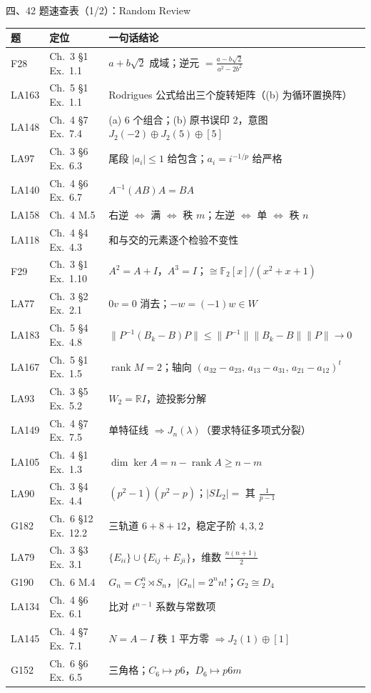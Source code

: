 \documentclass[aspectratio=169,10pt,fontset=none]{ctexbeamer}
\begin{document}
\begin{frame}[t]{四、42 题速查表（1/2）：Random Review}
  \label{sec:answers}
  \centering\scriptsize
  \setlength{\tabcolsep}{3.2pt}
  \renewcommand{\arraystretch}{0.95}
  \begin{tabular}{@{}l l l@{}}
    \toprule
    题 & 定位 & 一句话结论\\
    \midrule
    F28 & Ch.~3 \S1 Ex.~1.1 & $a+b\sqrt2$ 成域；逆元 $=\frac{a-b\sqrt2}{a^2-2b^2}$\\
    LA163 & Ch.~5 \S1 Ex.~1.1 & Rodrigues 公式给出三个旋转矩阵（(b) 为循环置换阵）\\
    LA148 & Ch.~4 \S7 Ex.~7.4 & (a) 6 个组合；(b) 原书误印 $2$，意图 $J_2(-2)\oplus J_2(5)\oplus[5]$\\
    LA97 & Ch.~3 \S6 Ex.~6.3 & 尾段 $|a_i|\le1$ 给包含；$a_i=i^{-1/p}$ 给严格\\
    LA140 & Ch.~4 \S6 Ex.~6.7 & $A^{-1}(AB)A=BA$\\
    LA158 & Ch.~4 M.5 & 右逆 $\Leftrightarrow$ 满 $\Leftrightarrow$ 秩 $m$；左逆 $\Leftrightarrow$ 单 $\Leftrightarrow$ 秩 $n$\\
    LA118 & Ch.~4 \S4 Ex.~4.3 & 和与交的元素逐个检验不变性\\
    F29 & Ch.~3 \S1 Ex.~1.10 & $A^2=A+I$，$A^3=I$；$\cong\mathbb F_2[x]/(x^2+x+1)$\\
    LA77 & Ch.~3 \S2 Ex.~2.1 & $0v=0$ 消去；$-w=(-1)w\in W$\\
    LA183 & Ch.~5 \S4 Ex.~4.8 & $\|P^{-1}(B_k-B)P\|\le\|P^{-1}\|\|B_k-B\|\|P\|\to0$\\
    LA167 & Ch.~5 \S1 Ex.~1.5 & $\operatorname{rank}M=2$；轴向 $(a_{32}{-}a_{23},\,a_{13}{-}a_{31},\,a_{21}{-}a_{12})^t$\\
    LA93 & Ch.~3 \S5 Ex.~5.2 & $W_2=\mathbb RI$，迹投影分解\\
    LA149 & Ch.~4 \S7 Ex.~7.5 & 单特征线 $\Rightarrow J_n(\lambda)$（要求特征多项式分裂）\\
    LA105 & Ch.~4 \S1 Ex.~1.3 & $\dim\ker A=n-\operatorname{rank}A\ge n-m$\\
    LA90 & Ch.~3 \S4 Ex.~4.4 & $(p^2-1)(p^2-p)$；$|SL_2|=$ 其 $\tfrac1{p-1}$\\
    G182 & Ch.~6 \S12 Ex.~12.2 & 三轨道 $6+8+12$，稳定子阶 $4,3,2$\\
    LA79 & Ch.~3 \S3 Ex.~3.1 & $\{E_{ii}\}\cup\{E_{ij}+E_{ji}\}$，维数 $\tfrac{n(n+1)}2$\\
    G190 & Ch.~6 M.4 & $G_n=C_2^n\rtimes S_n$，$|G_n|=2^nn!$；$G_2\cong D_4$\\
    LA134 & Ch.~4 \S6 Ex.~6.1 & 比对 $t^{n-1}$ 系数与常数项\\
    LA145 & Ch.~4 \S7 Ex.~7.1 & $N=A-I$ 秩 1 平方零 $\Rightarrow J_2(1)\oplus[1]$\\
    G152 & Ch.~6 \S6 Ex.~6.5 & 三角格；$C_6\mapsto p6$，$D_6\mapsto p6m$\\
    \bottomrule
  \end{tabular}
\end{frame}
\end{document}
